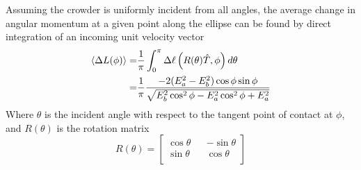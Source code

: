 Assuming the crowder is uniformly incident from all angles, the average change in angular momentum at a given point along the ellipse can be found by direct integration of an incoming unit velocity vector
%
\begin{align}
\left < \Delta L(\phi) \right > = &\frac{1}{\pi} \int_0^{\pi} 
{\Delta \ell \left ( R(\theta)\hat T, \phi \right ) d \theta} 
\\
= &\frac{1}{\pi}
\frac
{-2(E_a^2-E_b^2) \cos \phi  \sin \phi }
{\sqrt{E_b^2 \cos^2 \phi - E_a^2 \cos^2 \phi + E_a^2}}
\notag
\end{align}
Where $\theta$ is the incident angle with respect to the tangent point of contact at $\phi$, and $R(\theta)$ is the rotation matrix
%
\begin{equation}
R(\theta) =
\begin{bmatrix} 
\cos \theta && -\sin\theta \\ 
\sin \theta &&  \cos\theta \\  \end{bmatrix}
\end{equation}

